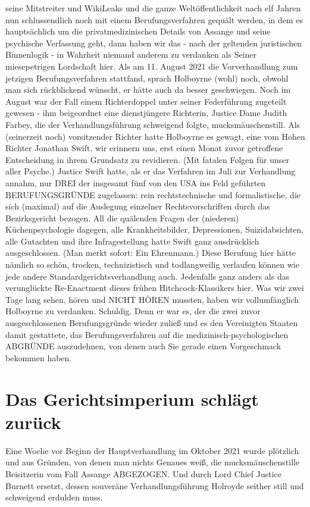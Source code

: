 \begin{multicols}{2}
seine Mitstreiter und WikiLeaks und die ganze Weltöffentlichkeit nach elf Jahren nun schlussendlich noch mit
einem Berufungsverfahren gequält werden, in dem es
hauptsächlich um die privatmedizinischen Details von
Assange und seine psychische Verfassung geht, dann haben wir das - nach der geltenden juristischen Binnenlogik - in Wahrheit niemand anderem zu verdanken als
Seiner miesepetrigen Lordschaft hier.
Als am 11. August 2021 die Vorverhandlung zum jetzigen
Berufungsverfahren stattfand, sprach Holboyrne (wohl)
noch, obwohl man sich rückblickend wünscht, er hätte
auch da besser geschwiegen. Noch im August war der
Fall einem Richterdoppel unter seiner Federführung zugeteilt gewesen - ihm beigeordnet eine dienstjüngere
Richterin, Justice Dame Judith Farbey, die der Verhandlungsführung schweigend folgte, mucksmäuschenstill.
Als (seinerzeit noch) vorsitzender Richter hatte Holboyrne es gewagt, eine vom Hohen Richter Jonathan Swift,
wir erinnern uns, erst einen Monat zuvor getroffene Entscheidung in ihrem Grundsatz zu revidieren. (Mit fatalen Folgen für unser aller Psyche.) Justice Swift hatte, als
er das Verfahren im Juli zur Verhandlung annahm, nur
DREI der insgesamt fünf von den USA ins Feld geführten BERUFUNGSGRÜNDE zugelassen: rein rechtstechnische und formalistische, die sich (maximal) auf die
Auslegung einzelner Rechtsvorschriften durch das Bezirksgericht bezogen. All die quälenden Fragen der (niederen) Küchenpsychologie dagegen, alle Krankheitsbilder, Depressionen, Suizidabsichten, alle Gutachten und
ihre Infragestellung hatte Swift ganz ausdrücklich ausgeschlossen. (Man merkt sofort: Ein Ehrenmann.)
Diese Berufung hier hätte nämlich so schön, trocken,
technizistisch und todlangweilig verlaufen können wie
jede andere Standardgerichtsverhandlung auch. Jedenfalls ganz anders als das verunglückte Re-Enactment
dieses frühen Hitchcock-Klassikers hier.
Was wir zwei Tage lang sehen, hören und NICHT HÖREN mussten, haben wir vollumfänglich Holboyrne zu
verdanken. Schuldig. Denn er war es, der die zwei zuvor
ausgeschlossenen Berufungsgründe wieder zuließ und
es den Vereinigten Staaten damit gestattete, das Berufungsverfahren auf die medizinisch-psychologischen
ABGRÜNDE auszudehnen, von denen auch Sie gerade
einen Vorgeschmack bekommen haben.


\chapter{Das Gerichtsimperium schlägt zurück}
Eine Woche vor Beginn der Hauptverhandlung im Oktober 2021 wurde plötzlich und aus Gründen, von denen
man nichts Genaues weiß, die mucksmäuschenstille
Beisitzerin vom Fall Assange ABGEZOGEN. Und durch
Lord Chief Justice Burnett ersetzt, dessen souveräne Verhandlungsführung Holroyde seither still und schweigend erdulden muss.


\end{multicols}
